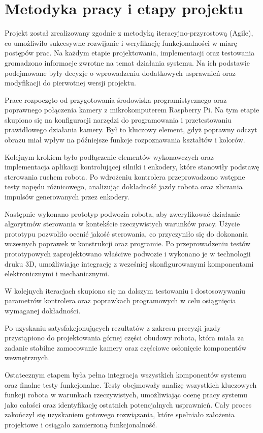 
\section{Metodyka pracy i etapy projektu}
Projekt został zrealizowany zgodnie z metodyką iteracyjno-przyrostową (Agile), co umożliwiło sukcesywne rozwijanie i weryfikację funkcjonalności w miarę postępów prac. Na każdym etapie projektowania, implementacji oraz testowania gromadzono informacje zwrotne na temat działania systemu. Na ich podstawie podejmowane były decyzje o wprowadzeniu dodatkowych usprawnień oraz modyfikacji do pierwotnej 
wersji projektu.

\hspace*{1cm}

Prace rozpoczęto od przygotowania środowiska programistycznego oraz poprawnego połączenia kamery z mikrokomputerem Raspberry Pi. Na tym etapie skupiono się na konfiguracji narzędzi do programowania i przetestowaniu prawidłowego działania kamery. Był to kluczowy element, gdyż poprawny odczyt obrazu miał wpływ na późniejsze funkcje rozpoznawania kształtów i kolorów.

Kolejnym krokiem było podłączenie elementów wykonawczych oraz implementacja aplikacji kontrolującej silniki i enkodery, które stanowiły podstawę sterowania ruchem robota. Po wdrożeniu kontrolera przeprowadzono wstępne testy napędu różnicowego, analizując dokładność jazdy robota oraz zliczania impulsów generowanych przez enkodery. 

Następnie wykonano prototyp podwozia robota, aby zweryfikować działanie algorytmów sterowania w kontekście rzeczywistych warunków pracy. Użycie prototypu pozwoliło ocenić jakość sterowania, co przyczyniło się do dokonania wczesnych poprawek w konstrukcji oraz programie. Po przeprowadzeniu testów prototypowych zaprojektowano właściwe podwozie i wykonano je w technologii druku 3D, umożliwiając integrację z wcześniej skonfigurowanymi komponentami elektronicznymi i mechanicznymi.

W kolejnych iteracjach skupiono się na dalszym testowaniu i dostosowywaniu parametrów kontrolera oraz poprawkach programowych w celu osiągnięcia wymaganej dokładności. 

Po uzyskaniu satysfakcjonujących rezultatów z zakresu precyzji jazdy przystąpiono do projektowania górnej części obudowy robota, która miała za zadanie stabilne zamocowanie kamery oraz częściowe osłonięcie komponentów wewnętrznych. 

Ostatecznym etapem była pełna integracja wszystkich komponentów systemu oraz finalne testy funkcjonalne. Testy obejmowały analizę wszystkich kluczowych funkcji robota w warunkach rzeczywistych, umożliwiając ocenę pracy systemu jako całości oraz identyfikację ostatnich potencjalnych usprawnień. Cały proces zakończył się uzyskaniem gotowego rozwiązania, które spełniało założenia projektowe i osiągało zamierzoną funkcjonalność.
